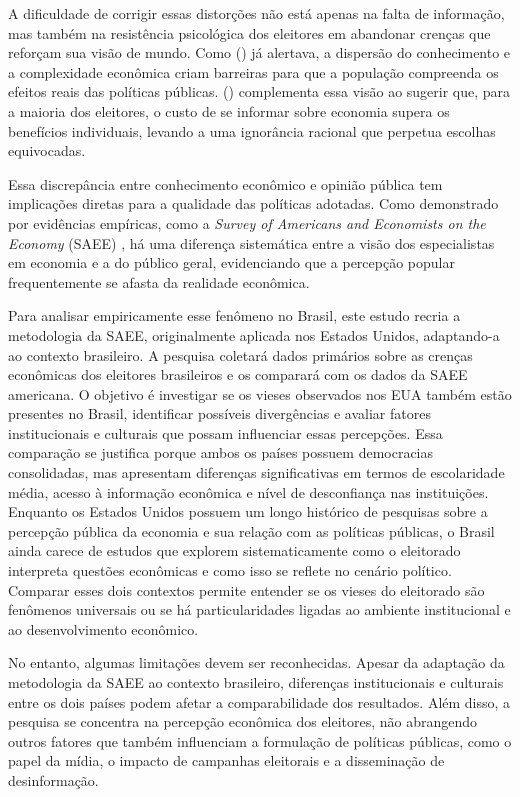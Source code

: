 A dificuldade de corrigir essas distorções não está apenas na falta de informação, mas também na resistência psicológica dos eleitores em abandonar crenças que reforçam sua visão de mundo. Como  (\citeyear{hayek_knowledge_use}) já alertava, a dispersão do conhecimento e a complexidade econômica criam barreiras para que a população compreenda os efeitos reais das políticas públicas.  (\citeyear{downs1957economic}) complementa essa visão ao sugerir que, para a maioria dos eleitores, o custo de se informar sobre economia supera os benefícios individuais, levando a uma ignorância racional que perpetua escolhas equivocadas.

Essa discrepância entre conhecimento econômico e opinião pública tem implicações diretas para a qualidade das políticas adotadas. Como demonstrado por evidências empíricas, como a \textit{Survey of Americans and Economists on the Economy} (SAEE) \cite{saee1996}, há uma diferença sistemática entre a visão dos especialistas em economia e a do público geral, evidenciando que a percepção popular frequentemente se afasta da realidade econômica.

Para analisar empiricamente esse fenômeno no Brasil, este estudo recria a metodologia da SAEE, originalmente aplicada nos Estados Unidos, adaptando-a ao contexto brasileiro. A pesquisa coletará dados primários sobre as crenças econômicas dos eleitores brasileiros e os comparará com os dados da SAEE americana. O objetivo é investigar se os vieses observados nos EUA também estão presentes no Brasil, identificar possíveis divergências e avaliar fatores institucionais e culturais que possam influenciar essas percepções. Essa comparação se justifica porque ambos os países possuem democracias consolidadas, mas apresentam diferenças significativas em termos de escolaridade média, acesso à informação econômica e nível de desconfiança nas instituições. Enquanto os Estados Unidos possuem um longo histórico de pesquisas sobre a percepção pública da economia e sua relação com as políticas públicas, o Brasil ainda carece de estudos que explorem sistematicamente como o eleitorado interpreta questões econômicas e como isso se reflete no cenário político. Comparar esses dois contextos permite entender se os vieses do eleitorado são fenômenos universais ou se há particularidades ligadas ao ambiente institucional e ao desenvolvimento econômico.

No entanto, algumas limitações devem ser reconhecidas. Apesar da adaptação da metodologia da SAEE ao contexto brasileiro, diferenças institucionais e culturais entre os dois países podem afetar a comparabilidade dos resultados. Além disso, a pesquisa se concentra na percepção econômica dos eleitores, não abrangendo outros fatores que também influenciam a formulação de políticas públicas, como o papel da mídia, o impacto de campanhas eleitorais e a disseminação de desinformação.

